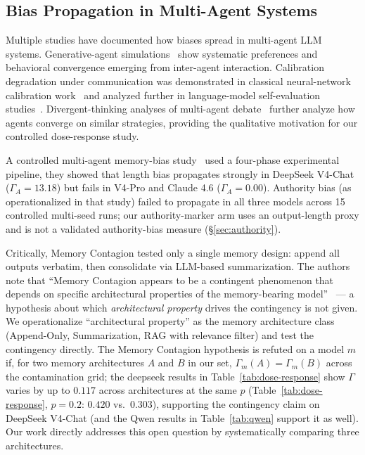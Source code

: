 \documentclass[11pt]{article}
\begin{document}
\subsection{Bias Propagation in Multi-Agent Systems}

Multiple studies have documented how biases spread in multi-agent LLM systems. Generative-agent simulations~\cite{park2023generative} show systematic preferences and behavioral convergence emerging from inter-agent interaction. Calibration degradation under communication was demonstrated in classical neural-network calibration work~\cite{guo2017calibration} and analyzed further in language-model self-evaluation studies~\cite{kadavath2022language}. Divergent-thinking analyses of multi-agent debate~\cite{liang2023multiagent} further analyze how agents converge on similar strategies, providing the qualitative motivation for our controlled dose-response study.

A controlled multi-agent memory-bias study~\cite{bertalanic2026cost,huang2026cagecal} used a four-phase experimental pipeline, they showed that length bias propagates strongly in DeepSeek V4-Chat ($\Gamma_A = 13.18$) but fails in V4-Pro and Claude 4.6 ($\Gamma_A = 0.00$). Authority bias (as operationalized in that study) failed to propagate in all three models across 15 controlled multi-seed runs; our authority-marker arm uses an output-length proxy and is not a validated authority-bias measure (\S\ref{sec:authority}).

Critically, Memory Contagion tested only a single memory design: append all outputs verbatim, then consolidate via LLM-based summarization. The authors note that ``Memory Contagion appears to be a contingent phenomenon that depends on specific architectural properties of the memory-bearing model''~\cite{memorycontagion2026} --- a hypothesis about which \emph{architectural property} drives the contingency is not given. We operationalize ``architectural property'' as the memory architecture class (Append-Only, Summarization, RAG with relevance filter) and test the contingency directly. The Memory Contagion hypothesis is refuted on a model $m$ if, for two memory architectures $A$ and $B$ in our set, $\Gamma_m(A) = \Gamma_m(B)$ across the contamination grid; the deepseek results in Table~\ref{tab:dose-response} show $\Gamma$ varies by up to $0.117$ across architectures at the same $p$ (Table~\ref{tab:dose-response}, $p{=}0.2$: $0.420$ vs.\ $0.303$), supporting the contingency claim on DeepSeek V4-Chat (and the Qwen results in Table~\ref{tab:qwen} support it as well). Our work directly addresses this open question by systematically comparing three architectures.
\end{document}
